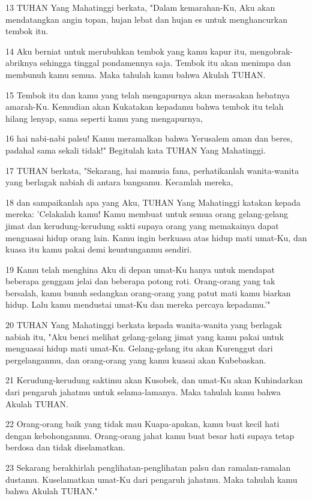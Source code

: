 \par 13 TUHAN Yang Mahatinggi berkata, "Dalam kemarahan-Ku, Aku akan mendatangkan angin topan, hujan lebat dan hujan es untuk menghancurkan tembok itu.
\par 14 Aku berniat untuk merubuhkan tembok yang kamu kapur itu, mengobrak-abriknya sehingga tinggal pondamennya saja. Tembok itu akan menimpa dan membunuh kamu semua. Maka tahulah kamu bahwa Akulah TUHAN.
\par 15 Tembok itu dan kamu yang telah mengapurnya akan merasakan hebatnya amarah-Ku. Kemudian akan Kukatakan kepadamu bahwa tembok itu telah hilang lenyap, sama seperti kamu yang mengapurnya,
\par 16 hai nabi-nabi palsu! Kamu meramalkan bahwa Yerusalem aman dan beres, padahal sama sekali tidak!" Begitulah kata TUHAN Yang Mahatinggi.
\par 17 TUHAN berkata, "Sekarang, hai manusia fana, perhatikanlah wanita-wanita yang berlagak nabiah di antara bangsamu. Kecamlah mereka,
\par 18 dan sampaikanlah apa yang Aku, TUHAN Yang Mahatinggi katakan kepada mereka: 'Celakalah kamu! Kamu membuat untuk semua orang gelang-gelang jimat dan kerudung-kerudung sakti supaya orang yang memakainya dapat menguasai hidup orang lain. Kamu ingin berkuasa atas hidup mati umat-Ku, dan kuasa itu kamu pakai demi keuntunganmu sendiri.
\par 19 Kamu telah menghina Aku di depan umat-Ku hanya untuk mendapat beberapa genggam jelai dan beberapa potong roti. Orang-orang yang tak bersalah, kamu bunuh sedangkan orang-orang yang patut mati kamu biarkan hidup. Lalu kamu mendustai umat-Ku dan mereka percaya kepadamu.'"
\par 20 TUHAN Yang Mahatinggi berkata kepada wanita-wanita yang berlagak nabiah itu, "Aku benci melihat gelang-gelang jimat yang kamu pakai untuk menguasai hidup mati umat-Ku. Gelang-gelang itu akan Kurenggut dari pergelanganmu, dan orang-orang yang kamu kuasai akan Kubebaskan.
\par 21 Kerudung-kerudung saktimu akan Kusobek, dan umat-Ku akan Kuhindarkan dari pengaruh jahatmu untuk selama-lamanya. Maka tahulah kamu bahwa Akulah TUHAN.
\par 22 Orang-orang baik yang tidak mau Kuapa-apakan, kamu buat kecil hati dengan kebohonganmu. Orang-orang jahat kamu buat besar hati supaya tetap berdosa dan tidak diselamatkan.
\par 23 Sekarang berakhirlah penglihatan-penglihatan palsu dan ramalan-ramalan dustamu. Kuselamatkan umat-Ku dari pengaruh jahatmu. Maka tahulah kamu bahwa Akulah TUHAN."

